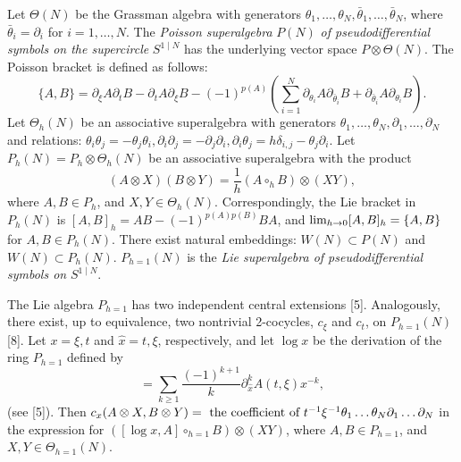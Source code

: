 \documentclass[a4paper,a4paper]{article}
\begin{document}
Let $\Theta(N)$ be
the Grassman algebra with generators
$\theta_1,\ldots, \theta_N, \bar{\theta}_1, \ldots, \bar{\theta}_N$,
where $\bar{\theta}_i = \partial_i$ for $i = 1, \ldots, N$.
The {\it Poisson superalgebra} $P(N)$ {\it of 
pseudodifferential symbols on the supercircle}   $S^{1\mid N}$ 
has the underlying vector space
$P\otimes \Theta (N)$.
The Poisson bracket is defined as follows:
\begin{equation}
\lbrace A, B \rbrace = 
\partial_{\xi}A\partial_{t}B -
\partial_tA\partial_{\xi}B - (-1)^{p(A)}
(\sum_{i=1}^N\partial_{\theta_i}A\partial_ {\bar{\theta}_i}B
+ \partial_ {\bar{\theta}_i}A\partial_{\theta_i}B).
\end{equation}
Let $\Theta_h(N)$ be an associative superalgebra
with generators
$\theta_1,\ldots, \theta_N, \partial_1,\ldots, \partial_N$
and relations: 
$\theta_i\theta_j = - \theta_j\theta_i,
\partial_i\partial_j = - \partial_j\partial_i,
\partial_i\theta_j = h\delta_{i,j}  - \theta_j\partial_i.$
Let
$P_h(N) = P_h \otimes \Theta_h(N)$
be an associative superalgebra with the product
\begin{equation}
(A \otimes X) (B \otimes  Y) = \frac {1}{h}(A\circ_h B)\otimes (X Y),
\end{equation}
where $A, B \in P_h$, and $X, Y \in \Theta_h(N)$.
Correspondingly, the Lie bracket in $P_h(N)$ is
$[A, B]_h = AB - (-1)^{p(A)p(B)}BA$,
and $\hbox{lim}_{h\rightarrow 0} [A, B]_h = \lbrace A, B \rbrace$
for $A, B \in P_h(N)$.
There exist natural embeddings:
$W(N)\subset P(N)$ and $W(N)\subset P_h(N)$.
$P_{h=1}(N)$ is the {\it Lie superalgebra of 
pseudodifferential symbols on}   $S^{1\mid N}$.

The Lie algebra $P_{h=1}$
has two independent central extensions [5].
Analogously, there exist, up to equivalence, two 
nontrivial 2-cocycles, $c_{\xi}$ and $c_t$,
on $P_{h=1}(N)$ [8].
Let $x = \xi, t$ and $\hat{x} = t, \xi$, respectively, and
let $\log  x$ be the derivation of the ring $P_{h=1}$ defined by
\begin{equation}
[\log  x,A(t, \xi)] = \sum_{k\geq 1}
 \frac {(-1)^{k+1}}{k}\partial^k_{\hat{x}}A(t, \xi)x^{-k},
\end{equation}
(see [5]). Then
$c_x(A \otimes X, B \otimes  Y) = 
\hbox { the coefficient of } t^{-1}\xi^{-1}\theta_1\ldots\theta_N
\partial_1\ldots\partial_N$ in the expression for
$([\log x,A]\circ_{h=1} B)\otimes (X Y)$, where 
$A, B \in P_{h=1}$, and $X, Y \in \Theta_{h=1}(N)$.
\end{document}
